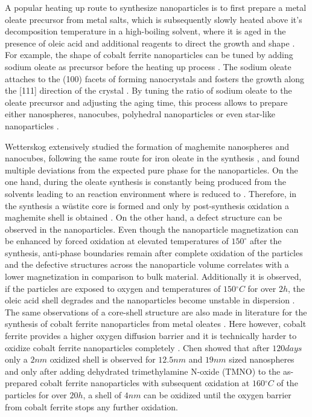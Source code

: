 \documentclass[\main/dresen_thesis.tex]{subfiles}
\begin{document}
  A popular heating up route to synthesize nanoparticles is to first prepare a metal oleate precursor from metal salts, which is subsequently slowly heated above it's decomposition temperature in a high-boiling solvent, where it is aged in the presence of oleic acid and additional reagents to direct the growth and shape \cite{Park_2004_Ultra, Wetterskog_2014_Preci}.
  For example, the shape of cobalt ferrite nanoparticles can be tuned by adding sodium oleate as precursor before the heating up process \cite{Bodnarchuk_2009_Excha}.
  The sodium oleate attaches to the (100) facets of forming nanocrystals and fosters the growth along the [111] direction of the crystal \cite{Bodnarchuk_2009_Excha}.
  By tuning the ratio of sodium oleate to the oleate precursor and adjusting the aging time, this process allows to prepare either nanospheres, nanocubes, polyhedral nanoparticles or even star-like nanoparticles \cite{Bodnarchuk_2009_Excha, Bao_2009_Forma, Wetterskog_2014_Preci}.

  Wetterskog \etal extensively studied the formation of maghemite nanospheres and nanocubes, following the same route for iron oleate in the synthesis \cite{Wetterskog_2014_Preci, Wetterskog_2013_Anoma}, and found multiple deviations from the expected pure phase for the nanoparticles.
  On the one hand, during the oleate synthesis  is constantly being produced from the solvents leading to an reaction environment where  is reduced to  \cite{Hai_2010_Sizec}.
  Therefore, in the synthesis a w\"ustite core is formed and only by post-synthesis oxidation a maghemite shell is obtained \cite{Wetterskog_2013_Anoma}.
  On the other hand, a defect structure can be observed in the nanoparticles.
  Even though the nanoparticle magnetization can be enhanced by forced oxidation at elevated temperatures of $150^\circ$ after the synthesis, anti-phase boundaries remain after complete oxidation of the particles \cite{Wetterskog_2013_Anoma} and the defective structures across the nanoparticle volume correlates with a lower magnetization in comparison to bulk material.
  Additionally it is observed, if the particles are exposed to oxygen and temperatures of $150 \unit{^\circ C}$ for over $2 \unit{h}$, the oleic acid shell degrades and the nanoparticles become unstable in dispersion \cite{Wetterskog_2013_Anoma}.
  The same observations of a core-shell structure are also made in literature for the synthesis of cobalt ferrite nanoparticles from metal oleates \cite{Bodnarchuk_2009_Excha}.
  Here however, cobalt ferrite provides a higher oxygen diffusion barrier and it is technically harder to oxidize cobalt ferrite nanoparticles completely \cite{Chen_2015_Synth}.
  Chen \etal \cite{Chen_2015_Synth} showed that after $120 \unit{days}$ only a $2 \unit{nm}$ oxidized shell is observed for $12.5 \unit{nm}$ and $19 \unit{nm}$ sized nanospheres and only after adding dehydrated trimethylamine N-oxide (TMNO) to the as-prepared cobalt ferrite nanoparticles with subsequent oxidation at $160 \unit{^\circ C}$ of the particles for over $20 \unit{h}$, a shell of $4 \unit{nm}$ can be oxidized until the oxygen barrier from cobalt ferrite stops any further oxidation.
\end{document}
